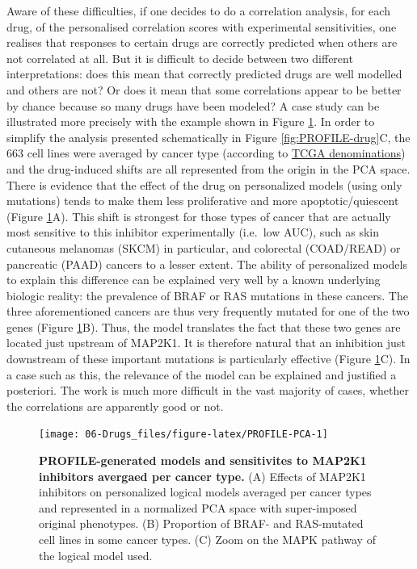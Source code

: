 \documentclass[a4paper,12pt,twoside,onecolumn,openright,final,oldfontcommands]{memoir}
\begin{document}
Aware of these difficulties, if one decides to do a correlation
analysis, for each drug, of the personalised correlation scores with
experimental sensitivities, one realises that responses to certain drugs
are correctly predicted when others are not correlated at all. But it is
difficult to decide between two different interpretations: does this
mean that correctly predicted drugs are well modelled and others are
not? Or does it mean that some correlations appear to be better by
chance because so many drugs have been modeled? A case study can be
illustrated more precisely with the example shown in Figure
\ref{fig:PROFILE-PCA}. In order to simplify the analysis presented
schematically in Figure \ref{fig:PROFILE-drug}C, the 663 cell lines were
averaged by cancer type (according to
\href{https://gdc.cancer.gov/resources-tcga-users/tcga-code-tables/tcga-study-abbreviations}{TCGA
denominations}) and the drug-induced shifts are all represented from the
origin in the PCA space. There is evidence that the effect of the drug
on personalized models (using only mutations) tends to make them less
proliferative and more apoptotic/quiescent (Figure
\ref{fig:PROFILE-PCA}A). This shift is strongest for those types of
cancer that are actually most sensitive to this inhibitor experimentally
(i.e.~low AUC), such as skin cutaneous melanomas (SKCM) in particular,
and colorectal (COAD/READ) or pancreatic (PAAD) cancers to a lesser
extent. The ability of personalized models to explain this difference
can be explained very well by a known underlying biologic reality: the
prevalence of BRAF or RAS mutations in these cancers. The three
aforementioned cancers are thus very frequently mutated for one of the
two genes (Figure \ref{fig:PROFILE-PCA}B). Thus, the model translates
the fact that these two genes are located just upstream of MAP2K1. It is
therefore natural that an inhibition just downstream of these important
mutations is particularly effective (Figure \ref{fig:PROFILE-PCA}C). In
a case such as this, the relevance of the model can be explained and
justified a posteriori. The work is much more difficult in the vast
majority of cases, whether the correlations are apparently good or not.

\begin{figure}

{\centering \texttt{[image: 06-Drugs\_files/figure-latex/PROFILE-PCA-1]} 

}

\caption[PROFILE-generated models and sensitivites to MAP2K1  inhibitors avergaed per cancer type]{\textbf{PROFILE-generated models and
sensitivites to MAP2K1 inhibitors avergaed per cancer type.} (A) Effects
of MAP2K1 inhibitors on personalized logical models averaged per cancer
types and represented in a normalized PCA space with super-imposed
original phenotypes. (B) Proportion of BRAF- and RAS-mutated cell lines
in some cancer types. (C) Zoom on the MAPK pathway of the logical model
used.}\label{fig:PROFILE-PCA}
\end{figure}
\end{document}
